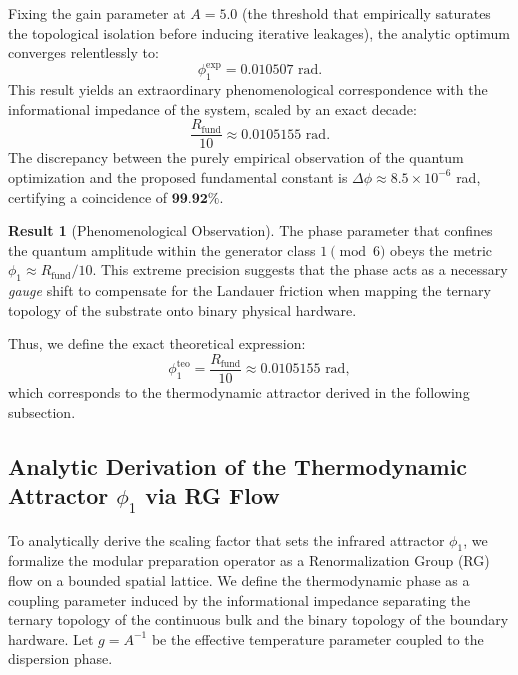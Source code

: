 \documentclass[12pt,a4paper]{article}
\theoremstyle{plain}
\theoremstyle{definition}
\newtheorem{result}[theorem]{Result}
\theoremstyle{remark}
\begin{document}
Fixing the gain parameter at $A = 5.0$ (the threshold that empirically saturates the topological isolation before inducing iterative leakages), the analytic optimum converges relentlessly to:
\begin{equation}
\phi_1^{\text{exp}} = 0.010507 \text{ rad}.
\end{equation}
This result yields an extraordinary phenomenological correspondence with the informational impedance of the system, scaled by an exact decade:
\begin{equation}
\frac{R_{\text{fund}}}{10} \approx 0.0105155 \text{ rad}.
\end{equation}
The discrepancy between the purely empirical observation of the quantum optimization and the proposed fundamental constant is $\Delta\phi \approx 8.5 \times 10^{-6}$ rad, certifying a coincidence of $\textbf{99.92\%}$. 

\begin{result}[Phenomenological Observation]
The phase parameter that confines the quantum amplitude within the generator class $1 \pmod 6$ obeys the metric $\phi_1 \approx R_{\text{fund}}/10$. This extreme precision suggests that the phase acts as a necessary \textit{gauge} shift to compensate for the Landauer friction when mapping the ternary topology of the substrate onto binary physical hardware.
\end{result}

Thus, we define the exact theoretical expression:
\begin{equation}
\phi_1^{\text{teo}} = \frac{R_{\text{fund}}}{10} \approx 0.0105155 \text{ rad},
\label{eq:phi1_teo}
\end{equation}
which corresponds to the thermodynamic attractor derived in the following subsection.

\subsection{Analytic Derivation of the Thermodynamic Attractor $\phi_1$ via RG Flow}
\label{sec:derivacion_phi1}

To analytically derive the scaling factor that sets the infrared attractor $\phi_1$, we formalize the modular preparation operator as a Renormalization Group (RG) flow on a bounded spatial lattice. We define the thermodynamic phase as a coupling parameter induced by the informational impedance separating the ternary topology of the continuous bulk and the binary topology of the boundary hardware. Let $g = A^{-1}$ be the effective temperature parameter coupled to the dispersion phase. 
\end{document}
